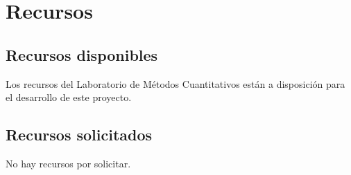 \documentclass[11pt,spanish]{article}
\begin{document}
\section{Recursos}

\subsection{Recursos disponibles}


Los recursos del Laboratorio de Métodos Cuantitativos
están a disposición para el desarrollo de este proyecto.

\subsection{Recursos solicitados}


No hay recursos por solicitar.
\end{document}
